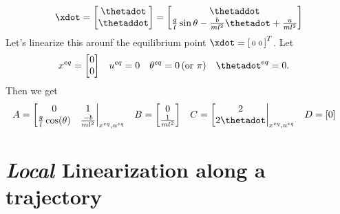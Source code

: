 \documentclass[10pt]{article}
\begin{document}
\begin{equation}
  \xdot =
  \begin{bmatrix}
    \thetadot \\ \thetaddot
  \end{bmatrix}
  =
  \begin{bmatrix}
    \thetaddot \\ 
    \frac{g}{l}\sin\theta - \frac{b}{ml^2}\thetadot + \frac{u}{ml^2}
  \end{bmatrix}
\end{equation}
Let's linearize this arounf the equilibrium point $ \xdot =
\left[\begin{smallmatrix}
  0 & 0 
\end{smallmatrix}\right]^T$.
Let 
\begin{align}
  \meq{x} &=
\begin{bmatrix}
  0 \\ 0 
\end{bmatrix} & \meq{u} &= 0 & \meq{\theta} &= 0\,(\text{or } \pi)
& \meq{\thetadot} & = 0.
\end{align}
Then we get
\begin{align}
  A &=\left[
  \begin{matrix}
    0 & 1 \\ \frac{g}{l}\cos(\theta) & \frac{-b}{ml^2}
  \end{matrix}\right|_{\meq{x},\meq{u}} &
  B &=
  \begin{bmatrix}
    0 \\ \frac{1}{ml^2}
  \end{bmatrix}&
  C &=\left[
  \begin{matrix}
    2 \\ 2\thetadot
  \end{matrix}\right|_{\meq{x},\meq{u}} &
  D &= \left[ 0 \right]
\end{align}

\section{\emph{Local} Linearization along a trajectory}

\newcommand{\sol}[1]{#1^{sol}}
\end{document}

